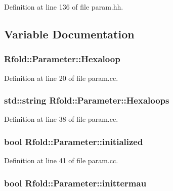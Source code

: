 Definition at line 136 of file param.\+hh.



\subsection{Variable Documentation}
\hypertarget{namespace_rfold_1_1_parameter_ada073d044583df20255bad48780ed37b}{
\subsubsection[{Hexaloop}]{ Rfold\+::\+Parameter\+::\+Hexaloop}}\label{namespace_rfold_1_1_parameter_ada073d044583df20255bad48780ed37b}


Definition at line 20 of file param.\+cc.

\hypertarget{namespace_rfold_1_1_parameter_a04c094fec1c14c49a01196be486d4883}{
\subsubsection[{Hexaloops}]{\setlength{\rightskip}{0pt plus 5cm}std\+::string Rfold\+::\+Parameter\+::\+Hexaloops}}\label{namespace_rfold_1_1_parameter_a04c094fec1c14c49a01196be486d4883}


Definition at line 38 of file param.\+cc.

\hypertarget{namespace_rfold_1_1_parameter_a34bb77f761084f77aeb4768d23fac3a1}{
\subsubsection[{initialized}]{\setlength{\rightskip}{0pt plus 5cm}bool Rfold\+::\+Parameter\+::initialized}}\label{namespace_rfold_1_1_parameter_a34bb77f761084f77aeb4768d23fac3a1}


Definition at line 41 of file param.\+cc.

\hypertarget{namespace_rfold_1_1_parameter_a634f9d3c0bb311c6f2fe39b7f32796d2}{
\subsubsection[{inittermau}]{\setlength{\rightskip}{0pt plus 5cm}bool Rfold\+::\+Parameter\+::inittermau}}\label{namespace_rfold_1_1_parameter_a634f9d3c0bb311c6f2fe39b7f32796d2}


